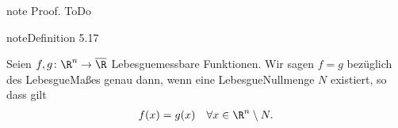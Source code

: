 \documentclass[letterpaper,10pt,english]{jupyterBook}
\begin{document}
\begin{sphinxadmonition}{note}
\sphinxAtStartPar
Proof. ToDo
\end{sphinxadmonition}
\label{masstheorie/lebesgue_integral:definition-9}
\begin{sphinxadmonition}{note}{Definition 5.17}



\sphinxAtStartPar
Seien \(f,g \colon \R^n \rightarrow \overline{\R}\) Lebesgue\sphinxhyphen{}messbare Funktionen.
Wir sagen \(f = g\)  bezüglich des Lebesgue\sphinxhyphen{}Maßes genau dann, wenn eine Lebesgue\sphinxhyphen{}Nullmenge \(N\) existiert, so dass gilt
\begin{equation*}
\begin{split}f(x) = g(x) \quad \forall x \in \R^n \setminus N.\end{split}
\end{equation*}\end{sphinxadmonition}
\end{document}
